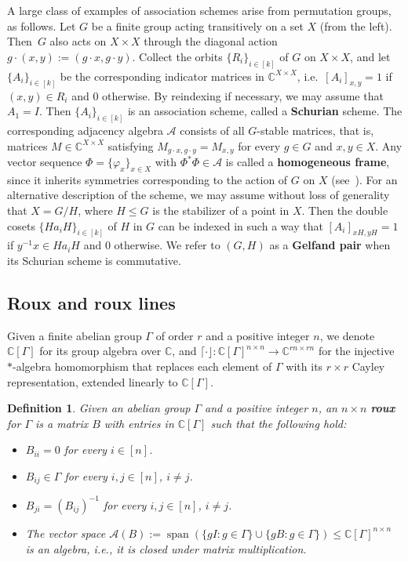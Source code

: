 \documentclass[11pt]{article}
\newtheorem{definition}[theo]{Definition}
\theoremstyle{definition}
\numberwithin{equation}{section}
\begin{document}
A large class of examples of association schemes arise from permutation groups, as follows.
Let $G$ be a finite group acting transitively on a set $X$ (from the left).
Then~$G$ also acts on $X \times X$ through the diagonal action $g\cdot (x,y) := (g\cdot x, g\cdot y)$.
Collect the orbits $\{ R_i \}_{i \in [k]}$ of $G$ on $X \times X$, and let $\{ A_i \}_{i \in [k]}$ be the corresponding indicator matrices in $\mathbb{C}^{X \times X}$, i.e.\ $[A_i]_{x,y} = 1$ if $(x,y) \in R_i$ and $0$ otherwise.
By reindexing if necessary, we may assume that $A_1 = I$.
Then $\{ A_i \}_{i\in [k]}$ is an association scheme, called a \textbf{Schurian} scheme.
The corresponding adjacency algebra $\mathscr{A}$ consists of all $G$-stable matrices, that is, matrices $M \in \mathbb{C}^{X\times X}$ satisfying $M_{g\cdot x, g\cdot y} = M_{x,y}$ for every $g \in G$ and $x,y \in X$.
Any vector sequence $\Phi = \{ \varphi_x \}_{x \in X}$ with $\Phi^* \Phi \in \mathscr{A}$ is called a \textbf{homogeneous frame}, since it inherits symmetries corresponding to the action of $G$ on $X$ (see~\cite{IversonJM:17}).
For an alternative description of the scheme, we may assume without loss of generality that $X = G/H$, where $H \leq G$ is the stabilizer of a point in $X$.
Then the double cosets $\{ H a_i H \}_{i \in [k]}$ of $H$ in $G$ can be indexed in such a way that $[A_i]_{xH,yH} = 1$ if $y^{-1}x \in Ha_i H$ and $0$ otherwise.
We refer to $(G,H)$ as a \textbf{Gelfand pair} when its Schurian scheme is commutative.


\subsection{Roux and roux lines}

Given a finite abelian group $\Gamma$ of order $r$ and a positive integer $n$, we denote $\mathbb{C}[\Gamma]$ for its group algebra over $\mathbb{C}$, and $\lceil \cdot \rfloor \colon \mathbb{C}[\Gamma]^{n\times n} \to \mathbb{C}^{rn \times rn}$ for the injective $\ast$-algebra homomorphism that replaces each element of $\Gamma$ with its $r\times r$ Cayley representation, extended linearly to $\mathbb{C}[\Gamma]$.

\begin{definition}
Given an abelian group $\Gamma$ and a positive integer $n$, an $n\times n$ \textbf{roux} for $\Gamma$ is a matrix $B$ with entries in $\mathbb{C}[\Gamma]$ such that the following hold:
\begin{itemize}
\item[(R1)]
$B_{ii}=0$ for every $i\in[n]$.
\item[(R2)]
$B_{ij}\in\Gamma$ for every $i,j\in[n]$, $i\neq j$.
\item[(R3)]
$B_{ji}=(B_{ij})^{-1}$ for every $i,j\in[n]$, $i\neq j$.
\item[(R4)]
The vector space $\mathscr{A}(B) := \operatorname{span} (\{ gI : g \in \Gamma\} \cup \{ gB : g \in \Gamma \}) \leq \mathbb{C}[\Gamma]^{n\times n}$ is an algebra, i.e., it is closed under matrix multiplication.
\end{itemize}
\end{definition}
\end{document}
